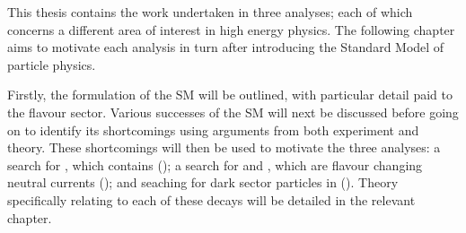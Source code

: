 
This thesis contains the work undertaken in three analyses; each of which concerns a different area
of interest in high energy physics.
The following chapter aims to motivate each analysis in turn after introducing the Standard Model
of particle physics.

Firstly, the formulation of the SM will be outlined, with particular detail paid to the flavour
sector.
Various successes of the SM will next be discussed before going on to identify its shortcomings
using arguments from both experiment and theory.
These shortcomings will then be used to motivate the three analyses:
a search for \btodsphi, which contains  ();
a search for \btokpipimumu and \btophikmumu, which are flavour changing neutral currents
();
and seaching for dark sector particles in \btokstmumu ().
Theory specifically relating to each of these decays will be detailed in the relevant chapter.

